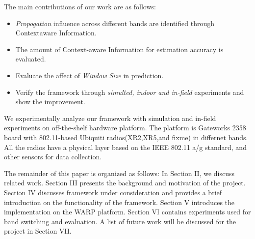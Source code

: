 


The main contributions of our work are as follows:
\begin{itemize}
\item \emph{Propogation} influence across different bands are identified through Contextaware Information.
\item The amount of Context-aware Information for estimation accuracy is evaluated.
\item Evaluate the affect of \emph{Window Size} in prediction.
\item Verify the framework through \emph{simulted, indoor and in-field} experiments and show the improvement.
\end{itemize}




We experimentally analyze our framework with simulation and in-field experiments on off-the-shelf hardware platform. The platform is Gateworks 2358 board with 802.11-based Ubiquiti radios(XR2,XR5,and fixme) in differnet bands. All the radios have a physical layer based on the IEEE 802.11 a/g standard, and other sensors for data collection.

The remainder of this paper is organized as follows: In Section II, we discuss related work. Section III presents the background and motivation of the project.  Section IV discusses framework under consideration and provides a brief introduction on the functionality of the framework. Section V introduces the implementation on the WARP platform. Section VI contains experiments used for band switching and evaluation.  A list of future work will be discussed for the project in Section VII.



